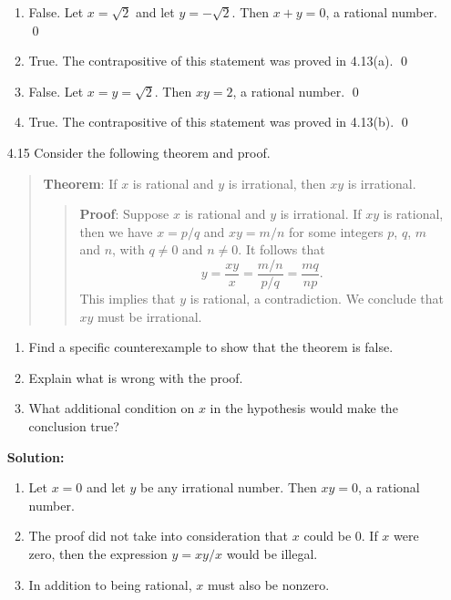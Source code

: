 \begin{enumerate}
		\begin{enumerate}
			\item	False. Let $x = \sqrt{2}$ and let $y = -\sqrt{2}$. Then
					$x + y = 0$, a rational number. \qed
			\item	True. The contrapositive of this statement was proved in
					4.13(a). \qed
			\item	False. Let $x = y = \sqrt{2}$. Then $xy = 2$, a rational
					number. \qed
			\item	True. The contrapositive of this statement was proved in
					4.13(b). \qed
      \end{enumerate} 
   \item[4.15] Consider the following theorem and proof.
               \begin{quote}
                  \textbf{Theorem}: If $x$ is rational and $y$ is irrational,
                  then $xy$ is irrational.
                  \begin{quote}
                     \textbf{Proof}: Suppose $x$ is rational and $y$ is
                     irrational. If $xy$ is rational, then we have $x = p/q$ and
                     $xy = m/n$ for some integers $p$, $q$, $m$ and $n$, with
                     $q \neq 0$ and $n \neq 0$. It follows that
                     $$y = \frac{xy}{x} = \frac{m/n}{p/q} = \frac{mq}{np}.$$
                     This implies that $y$ is rational, a contradiction. We
                     conclude that $xy$ must be irrational.
                  \end{quote}
               \end{quote}
               \begin{enumerate}
                  \item Find a specific counterexample to show that the theorem
                        is false.
                  \item Explain what is wrong with the proof.
                  \item What additional condition on $x$ in the hypothesis would
                        make the conclusion true?
               \end{enumerate}
					
		\textbf{Solution:}
		
		\begin{enumerate}
			\item	Let $x = 0$ and let $y$ be any irrational number. Then $xy = 0$,
					a rational number.
         \item The proof did not take into consideration that $x$ could be 0.
               If $x$ were zero, then the expression $y = xy/x$ would be
               illegal.
         \item In addition to being rational, $x$ must also be nonzero.


\end{enumerate}
\end{enumerate}
